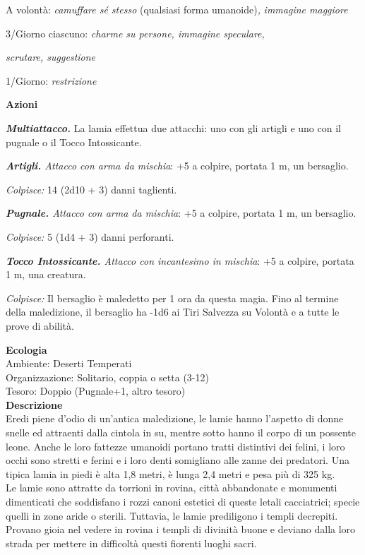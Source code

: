 \begin{multicols}{2}
A volontà: \emph{camuffare sé stesso} (qualsiasi forma umanoide)\emph{,} \emph{immagine maggiore}

3/Giorno ciascuno: \emph{charme su persone, immagine speculare,}

\emph{scrutare, suggestione}

1/Giorno: \emph{restrizione}

\textbf{Azioni}

\emph{\textbf{Multiattacco.}} La lamia effettua due attacchi: uno con
gli artigli e uno con il pugnale o il Tocco Intossicante.

\emph{\textbf{Artigli.} Attacco con arma da mischia}: +5 a colpire, portata 1 m, un bersaglio.

\emph{Colpisce:} 14 (2d10 + 3) danni taglienti.

\emph{\textbf{Pugnale.} Attacco con arma da mischia}: +5 a colpire, portata 1 m, un bersaglio.

\emph{Colpisce:} 5 (1d4 + 3) danni perforanti.

\emph{\textbf{Tocco Intossicante.} Attacco con incantesimo in mischia}: +5 a colpire, portata 1 m, una creatura.

\emph{Colpisce:} Il bersaglio è maledetto per 1 ora da questa magia. Fino al termine della maledizione, il bersaglio ha -1d6 ai Tiri Salvezza su Volontà e a tutte le prove di abilità.

\textbf{Ecologia}\\
Ambiente: Deserti Temperati\\
Organizzazione: Solitario, coppia o setta (3-12)\\
Tesoro: Doppio (Pugnale+1, altro tesoro)\\

\textbf{Descrizione}\\
Eredi piene d'odio di un'antica maledizione, le lamie hanno l'aspetto di donne snelle ed attraenti dalla cintola in su, mentre sotto hanno il corpo di un possente leone. Anche le loro fattezze umanoidi portano tratti distintivi dei felini, i loro occhi sono stretti e ferini e i loro denti somigliano alle zanne dei predatori. Una tipica lamia in piedi è alta 1,8 metri, è lunga 2,4 metri e pesa più di 325 kg.\\

Le lamie sono attratte da torrioni in rovina, città abbandonate e monumenti dimenticati che soddisfano i rozzi canoni estetici di queste letali cacciatrici; specie quelli in zone aride o sterili. Tuttavia, le lamie prediligono i templi decrepiti. Provano gioia nel vedere in rovina i templi di divinità buone e deviano dalla loro strada per mettere in difficoltà questi fiorenti luoghi sacri.\\


\end{multicols}
